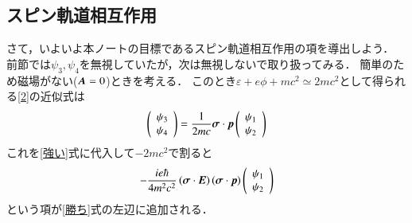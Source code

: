 \documentclass[a4paper,11pt]{jsarticle}
\numberwithin{equation}{section}
\newcommand{\bvec}[1]{\mbox{\boldmath $#1$}}
\begin{document}
\subsection{スピン軌道相互作用}
さて，いよいよ本ノートの目標であるスピン軌道相互作用の項を導出しよう．
前節では$\psi_3,\psi_4$を無視していたが，次は無視しないで取り扱ってみる．
簡単のため磁場がない($\bvec{A}=0$)ときを考える．
このとき$\varepsilon+e\phi+mc^2\simeq 2mc^2$として得られる\eqref{2}の近似式は
\begin{equation}
    \begin{aligned}
      \left(
        \begin{array}{c}
        \psi_3 \\
        \psi_4
      \end{array}
      \right)
      =\frac{1}{2mc}\bvec{\sigma}\cdot\bvec{p}
      \left(
        \begin{array}{c}
        \psi_1 \\
        \psi_2
      \end{array}
      \right)
    \end{aligned}
  \end{equation}  
これを\eqref{強い}式に代入して$-2mc^2$で割ると
\begin{equation}
    \begin{aligned}
      -\frac{ie\hbar}{4m^2c^2}
      \left(\bvec{\sigma}\cdot\bvec{E}\right)
      \left(\bvec{\sigma}\cdot\bvec{p}\right)
      \left(
        \begin{array}{c}
        \psi_1 \\
        \psi_2
      \end{array}
      \right)
  \end{aligned}
  \label{卵}
\end{equation}
という項が\eqref{勝ち}式の左辺に追加される．
\end{document}
